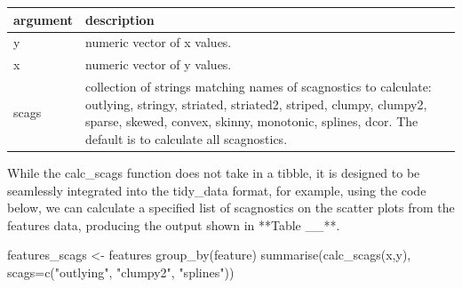 \begin{Schunk}

\begin{tabular}{l|l}
\hline
argument & description\\
\hline
y & numeric vector of x values.\\
\hline
x & numeric vector of y values.\\
\hline
scags & collection of strings matching names of scagnostics to calculate: outlying, stringy, striated, striated2, striped, clumpy, clumpy2, sparse, skewed, convex, skinny, monotonic, splines, dcor. The default is to calculate all scagnostics.\\
\hline
\end{tabular}

\end{Schunk}

While the calc\_scags function does not take in a tibble, it is designed
to be seamlessly integrated into the tidy\_data format, for example,
using the code below, we can calculate a specified list of scagnostics
on the scatter plots from the features data, producing the output shown
in **Table \_\_**.

\begin{Schunk}
\begin{Sinput}
features_scags <- features %
  group_by(feature) %
  summarise(calc_scags(x,y), scags=c("outlying", "clumpy2", "splines"))
\end{Sinput}
\end{Schunk}

